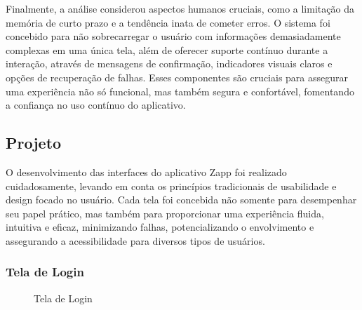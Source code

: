 \documentclass[a4paper, 12pt]{article}
\begin{document}
Finalmente, a análise considerou aspectos humanos cruciais, como a limitação da memória de curto prazo e a tendência inata de cometer erros. O sistema foi concebido para não sobrecarregar o usuário com informações demasiadamente complexas em uma única tela, além de oferecer suporte contínuo durante a interação, através de mensagens de confirmação, indicadores visuais claros e opções de recuperação de falhas. Esses componentes são cruciais para assegurar uma experiência não só funcional, mas também segura e confortável, fomentando a confiança no uso contínuo do aplicativo.

\subsection{Projeto}
O desenvolvimento das interfaces do aplicativo Zapp foi realizado cuidadosamente, levando em conta os princípios tradicionais de usabilidade e design focado no usuário.  Cada tela foi concebida não somente para desempenhar seu papel prático, mas também para proporcionar uma experiência fluida, intuitiva e eficaz, minimizando falhas, potencializando o envolvimento e assegurando a acessibilidade para diversos tipos de usuários.

\subsubsection{Tela de Login}

\begin{figure}[H]
  \centering
  \caption{Tela de Login}
  \label{fig:login}
\end{figure}
\end{document}
